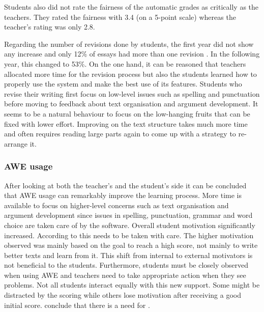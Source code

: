 \documentclass[runningheads]{llncs}
\begin{document}
Students also did not rate the fairness of the automatic grades as critically as the teachers. They rated the fairness with 3.4 (on a 5-point scale) whereas the teacher's rating was only 2.8.

Regarding the number of revisions done by students, the first year did not show any increase and only 12\% of essays had more than one revision \citep{grimes_utility_2010}. In the following year, this changed to 53\%. On the one hand, it can be reasoned that teachers allocated more time for the revision process but also the students learned how to properly use the system and make the best use of its features. Students who revise their writing first focus on low-level issues such as spelling and punctuation before moving to feedback about text organisation and argument development. It seems to be a natural behaviour to focus on the low-hanging fruits that can be fixed with lower effort. Improving on the text structure takes much more time and often requires reading large parts again to come up with a strategy to re-arrange it.

\subsubsection{AWE usage} After looking at both the teacher's and the student's side it can be concluded that AWE usage can remarkably improve the learning process. More time is available to focus on higher-level concerns such as text organisation and argument development since issues in spelling, punctuation, grammar and word choice are taken care of by the software. Overall student motivation significantly increased. According to \textcite{grimes_utility_2010} this needs to be taken with care. The higher motivation observed was mainly based on the goal to reach a high score, not mainly to write better texts and learn from it. This shift from internal to external motivators is not beneficial to the students. Furthermore, students must be closely observed when using AWE and teachers need to take appropriate action when they see problems. Not all students interact equally with this new support. Some might be distracted by the scoring while others lose motivation after receiving a good initial score. \citeauthor{grimes_utility_2010} conclude that there is a need for .
\end{document}

